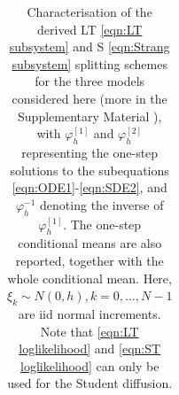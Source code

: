 \documentclass[a4paper,12pt]{article}
\numberwithin{equation}{section}
\theoremstyle{plain}
\theoremstyle{definition}
\begin{document}
\begin{table}
\begin{tabular}{ccc}
    \bottomrule
    \end{tabular}     \caption{Characterisation of the derived LT  \eqref{eqn:LT subsystem} and S \eqref{eqn:Strang subsystem} splitting schemes for the three models considered here (more in the Supplementary Material \cite{Fangetal26}), with $\varphi^{[1]}_h$ and $\varphi^{[2]}_h$ representing the one-step solutions to the subequations \eqref{eqn:ODE1}-\eqref{eqn:SDE2}, and $\varphi^{-1}_h$ denoting the inverse of $\varphi^{[1]}_h$. The one-step conditional means are also reported, together with the whole conditional mean. Here, $\xi_k\sim N(0,h), k=0,\ldots, N-1$ are iid normal increments. Note that \eqref{eqn:LT loglikelihood} and \eqref{eqn:ST loglikelihood} can only be used for the Student diffusion.}
    \label{TablePearson}
\end{table}
\end{document}
